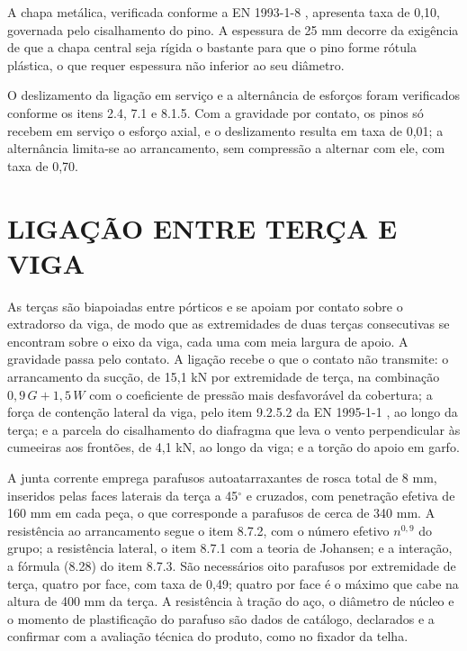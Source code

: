 A chapa metálica, verificada conforme a EN 1993-1-8 \cite{EN1993-1-8:2005},
apresenta taxa de 0,10, governada pelo cisalhamento do pino. A espessura de
25 mm decorre da exigência de que a chapa central seja rígida o bastante para
que o pino forme rótula plástica, o que requer espessura não inferior ao seu
diâmetro.

O deslizamento da ligação em serviço e a alternância de esforços foram
verificados conforme os itens 2.4, 7.1 e 8.1.5. Com a gravidade por contato, os
pinos só recebem em serviço o esforço axial, e o deslizamento resulta em taxa de
0,01; a alternância limita-se ao arrancamento, sem compressão a alternar com
ele, com taxa de 0,70.

\section{LIGAÇÃO ENTRE TERÇA E VIGA}\label{sec:ligacao-terca-viga}

As terças são biapoiadas entre pórticos e se apoiam por contato sobre o
extradorso da viga, de modo que as extremidades de duas terças consecutivas se
encontram sobre o eixo da viga, cada uma com meia largura de apoio. A gravidade
passa pelo contato. A ligação recebe o que o contato não transmite: o
arrancamento da sucção, de 15,1 kN por extremidade de terça, na combinação
$0{,}9\,G + 1{,}5\,W$ com o coeficiente de pressão mais desfavorável da
cobertura; a força de contenção lateral da viga, pelo item 9.2.5.2 da
EN 1995-1-1 \cite{EN1995-1-1:2004}, ao longo da terça; e a parcela do
cisalhamento do diafragma que leva o vento perpendicular às cumeeiras aos
frontões, de 4,1 kN, ao longo da viga; e a torção do apoio em garfo.

A junta corrente emprega parafusos autoatarraxantes de rosca total de 8 mm,
inseridos pelas faces laterais da terça a 45$^{\circ}$ e cruzados, com penetração
efetiva de 160 mm em cada peça, o que corresponde a parafusos de cerca de 340 mm. A resistência ao arrancamento segue o item 8.7.2,
com o número efetivo $n^{0,9}$ do grupo; a resistência lateral, o item 8.7.1 com
a teoria de Johansen; e a interação, a fórmula (8.28) do item 8.7.3. São
necessários oito parafusos por extremidade de terça, quatro por face, com taxa de
0,49; quatro por face é o máximo que cabe na altura de 400 mm da terça. A resistência à tração do aço, o diâmetro de núcleo e o momento de
plastificação do parafuso são dados de catálogo, declarados e a confirmar com a
avaliação técnica do produto, como no fixador da telha.

